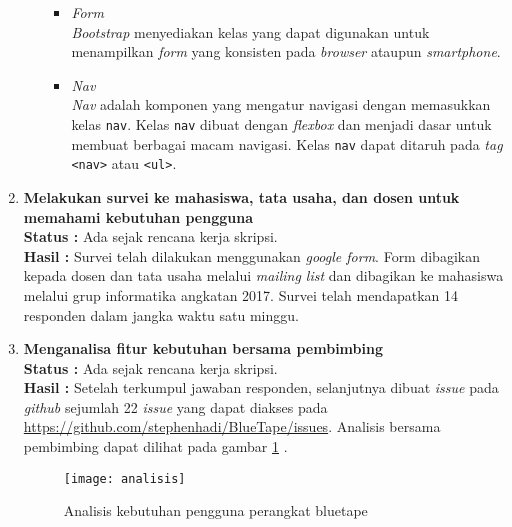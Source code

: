 \documentclass[a4paper,twoside]{article}
\begin{document}
\begin{enumerate}
\begin{enumerate}
\begin{itemize}
		\item \textit{Form} \\
		\textit{Bootstrap} menyediakan kelas yang dapat digunakan untuk menampilkan \textit{form} yang konsisten pada \textit{browser} ataupun \textit{smartphone}.
		
		\item \textit{Nav} \\
		\textit{Nav} adalah komponen yang mengatur navigasi dengan memasukkan kelas \texttt{nav}. Kelas \texttt{nav} dibuat dengan \textit{flexbox} dan menjadi dasar untuk membuat berbagai macam navigasi. Kelas \texttt{nav} dapat ditaruh pada \textit{tag} \texttt{<nav>} atau \texttt{<ul>}. 
	\end{itemize}
	\end{enumerate}
		
	\item \textbf{Melakukan survei ke mahasiswa, tata usaha, dan dosen untuk memahami kebutuhan pengguna}\\
	{\bf Status :} Ada sejak rencana kerja skripsi.\\		
	{\bf Hasil :} Survei telah dilakukan menggunakan \textit{google form}. Form dibagikan kepada dosen dan tata usaha melalui \textit{mailing list} dan dibagikan ke mahasiswa melalui grup informatika angkatan 2017. Survei telah mendapatkan 14 responden dalam jangka waktu satu minggu. 

	\item \textbf{Menganalisa fitur kebutuhan bersama pembimbing }\\
	{\bf Status :} Ada sejak rencana kerja skripsi.\\
	{\bf Hasil :} Setelah terkumpul jawaban responden, selanjutnya dibuat \textit{issue} pada \textit{github} sejumlah 22 \textit{issue} yang dapat diakses pada \url{https://github.com/stephenhadi/BlueTape/issues}. Analisis bersama pembimbing dapat dilihat pada gambar \ref{fig:analisis} .
	
	\begin{figure}[H]
		\centering
		\texttt{[image: analisis]} 
		\caption{Analisis kebutuhan pengguna perangkat bluetape}
		\label{fig:analisis} 
	\end{figure}
	

\end{enumerate}
\end{document}
